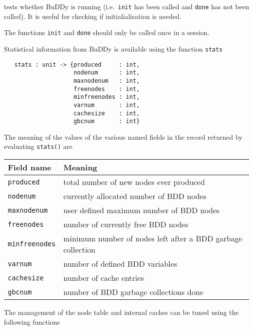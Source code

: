 \documentclass[12pt]{article}
\newcommand{\bnind}[1]{\index[MLbn]{\texttt{#1}}}
\renewcommand{\t}[1]{\mbox{\tt #1}}
\newcommand{\Buddy}{BuDDy\xspace}
\begin{document}
tests whether
\Buddy{} is running (i.e.~\t{init} has been called and \t{done} has not been called). It is
useful for checking if initialialisation is needed.

The functions \t{init} and \t{done} should only be called once in a session.

Statistical information from \Buddy{} is available
using the function \t{stats}

\begin{verbatim}
   stats : unit -> {produced     : int,
                    nodenum      : int,
                    maxnodenum   : int,
                    freenodes    : int,
                    minfreenodes : int,
                    varnum       : int,
                    cachesize    : int,
                    gbcnum       : int}
\end{verbatim}\bnind{stats}

The meaning of the values of the various named fields in the record returned by
evaluating \t{stats()} are

\medskip

\begin{tabular}{|l|l|} \hline
{\bf{Field name}}& {\bf{Meaning}}                                              \\ \hline\hline
\t{produced}     & total number of new nodes ever produced                     \\ \hline
\t{nodenum}      & currently allocated number of BDD nodes                     \\ \hline
\t{maxnodenum}   & user defined maximum number of BDD nodes                    \\ \hline
\t{freenodes}    & number of currently free BDD nodes                          \\ \hline
\t{minfreenodes} & minimum number of nodes left after a BDD garbage collection \\ \hline
\t{varnum}       & number of defined BDD variables                             \\ \hline
\t{cachesize}    & number of cache entries                                     \\ \hline
\t{gbcnum}       & number of BDD garbage collections done                      \\ \hline
\end{tabular}

\medskip

The management of the node table and internal caches can be tuned
using the following functions
\end{document}
